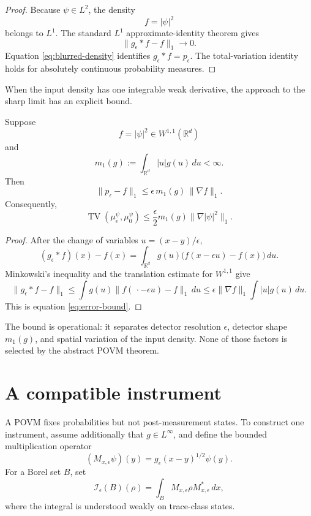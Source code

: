\documentclass[11pt]{article}
\newcommand{\Ical}{\mathcal I}
\newcommand{\TV}{\operatorname{TV}}
\begin{document}
\begin{proof}
Because \(\psi\in L^2\), the density
\[
f=|\psi|^2
\]
belongs to \(L^1\). The standard \(L^1\) approximate-identity theorem gives
\[
\|g_\epsilon*f-f\|_1\longrightarrow0.
\]
Equation \eqref{eq:blurred-density} identifies
\(g_\epsilon*f=p_\epsilon\). The total-variation identity holds for
absolutely continuous probability measures.
\end{proof}

When the input density has one integrable weak derivative, the approach to
the sharp limit has an explicit bound.

\begin{theorem}
\label{thm:error-bound}
Suppose
\[
f=|\psi|^2\in W^{1,1}(\mathbb R^d)
\]
and
\[
m_1(g):=\int_{\mathbb R^d}|u|g(u)\,du<\infty.
\]
Then
\begin{equation}
\|p_\epsilon-f\|_1
\leq
\epsilon\,m_1(g)\,\|\nabla f\|_1.
\label{eq:error-bound}
\end{equation}
Consequently,
\[
\TV(\mu_\epsilon^\psi,\mu_0^\psi)
\leq
\frac{\epsilon}{2}m_1(g)\|\nabla|\psi|^2\|_1.
\]
\end{theorem}

\begin{proof}
After the change of variables \(u=(x-y)/\epsilon\),
\[
(g_\epsilon*f)(x)-f(x)
=\int_{\mathbb R^d}
g(u)\bigl(f(x-\epsilon u)-f(x)\bigr)\,du.
\]
Minkowski's inequality and the translation estimate for \(W^{1,1}\) give
\[
\|g_\epsilon*f-f\|_1
\leq
\int g(u)
\|f(\,\cdot-\epsilon u)-f\|_1\,du
\leq
\epsilon\|\nabla f\|_1
\int |u|g(u)\,du.
\]
This is equation \eqref{eq:error-bound}.
\end{proof}

The bound is operational: it separates detector resolution
\(\epsilon\), detector shape \(m_1(g)\), and spatial variation of the input
density. None of those factors is selected by the abstract POVM theorem.

\section{A compatible instrument}

A POVM fixes probabilities but not post-measurement states. To construct one
instrument, assume additionally that \(g\in L^\infty\), and define the
bounded multiplication operator
\[
(M_{x,\epsilon}\psi)(y)
=g_\epsilon(x-y)^{1/2}\psi(y).
\]
For a Borel set \(B\), set
\begin{equation}
\Ical_\epsilon(B)(\rho)
=\int_B
M_{x,\epsilon}\rho M_{x,\epsilon}^{*}\,dx,
\label{eq:instrument}
\end{equation}
where the integral is understood weakly on trace-class states.
\end{document}
